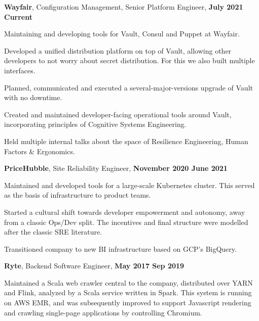 \documentclass[a4paper]{article}
\renewenvironment{itemize}{
  \begin{list}{}{
      \setlength{\leftmargin}{1em}
      \setlength{\itemsep}{3pt}
  }
}{
  \end{list}
}
\begin{document}
\begin{itemize}
\item \textbf{Wayfair}, Configuration Management, Senior Platform Engineer, \textbf{July 2021 {\textendash} Current}
  \begin{itemize}
  \item Maintaining and developing tools for Vault, Consul and Puppet at
    Wayfair.
  \item Developed a unified distribution platform on top of Vault, allowing
    other developers to not worry about secret distribution. For this we also
    built multiple interfaces.
  \item Planned, communicated and executed a several-major-versions upgrade of
    Vault with no downtime.
  \item Created and maintained developer-facing operational tools around Vault,
    incorporating principles of Cognitive Systems Engineering.
  \item Held multiple internal talks about the space of Resilience Engineering,
    Human Factors \& Ergonomics.
  \end{itemize}
\item \textbf{PriceHubble}, Site Reliability Engineer, \textbf{November 2020 {\textendash} June 2021}
  \begin{itemize}
    \item Maintained and developed tools for a large-scale Kubernetes
      cluster. This served as the basis of infrastructure to product teams.
    \item Started a cultural shift towards developer empowerment and autonomy,
      away from a classic Ops/Dev split. The incentives and final structure were
      modelled after the classic SRE literature.
    \item Transitioned company to new BI infrastructure based on GCP's
      BigQuery.
  \end{itemize}
\item \textbf{Ryte}, Backend Software Engineer, \textbf{May 2017 {\textendash} Sep 2019}
   \begin{itemize}
      \item Maintained a Scala web crawler central to the company,
        distributed over YARN and Flink, analyzed by a Scala service
        written in Spark. This system is running on AWS EMR, and was
        subsequently improved to support Javascript rendering and crawling
        single-page applications by controlling Chromium.
  \end{itemize}
\end{itemize}
\end{document}
